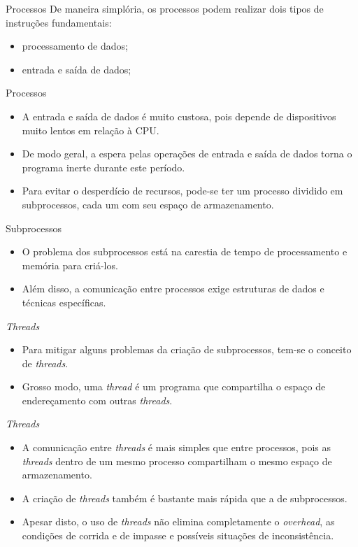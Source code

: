 \documentclass[11pt,justified]{beamer}
\begin{document}
\begin{frame}{Processos}
    De maneira simplória, os processos podem realizar dois tipos de instruções fundamentais:
    \begin{itemize}
        \item processamento de dados;
        \item entrada e saída de dados;
    \end{itemize}
\end{frame}

\begin{frame}{Processos}
    \begin{itemize}
        \item A entrada e saída de dados é muito custosa, pois depende de dispositivos muito lentos em relação à CPU.
        \item De modo geral, a espera pelas operações de entrada e saída de dados torna o programa inerte durante este período.
        \item Para evitar o desperdício de recursos, pode-se ter um processo dividido em subprocessos, cada um com seu espaço de armazenamento.
    \end{itemize}
\end{frame}

\begin{frame}{Subprocessos}
    \begin{itemize}
        \item O problema dos subprocessos está na carestia de tempo de processamento e memória para criá-los.
        \item Além disso, a comunicação entre processos exige estruturas de dados e técnicas específicas.
    \end{itemize}
\end{frame}

\begin{frame}{\textit{Threads}}
    \begin{itemize}
        \item Para mitigar alguns problemas da criação de subprocessos, tem-se o conceito de \textit{threads}.
        \item Grosso modo, uma \textit{thread} é um programa que compartilha o espaço de endereçamento com outras \textit{threads}.
    \end{itemize}
\end{frame}

\begin{frame}{\textit{Threads}}
    \begin{itemize}
        \item A comunicação entre \textit{threads} é mais simples que entre processos, pois as \textit{threads} dentro de um mesmo processo compartilham o mesmo espaço de armazenamento.
        \item A criação de \textit{threads} também é bastante mais rápida que a de subprocessos.
        \item Apesar disto, o uso de \textit{threads} não elimina completamente o \textit{overhead}, as condições de corrida e de impasse e possíveis situações de inconsistência.
    \end{itemize}
\end{frame}
\end{document}
